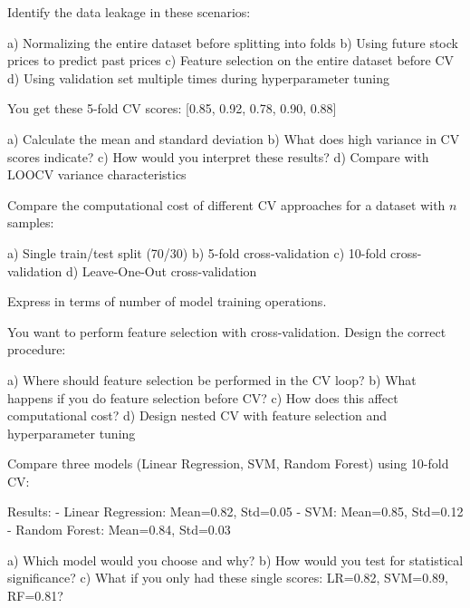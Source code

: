 \documentclass{article}
\newcounter{exercise}
\begin{document}
\begin{tcolorbox}[colback=gray!5!white,colframe=gray!75!black,title=Problem \stepcounter{exercise}: Data Leakage Identification]

Identify the data leakage in these scenarios:

a) Normalizing the entire dataset before splitting into folds
b) Using future stock prices to predict past prices
c) Feature selection on the entire dataset before CV
d) Using validation set multiple times during hyperparameter tuning
\end{tcolorbox}

\begin{tcolorbox}[colback=gray!5!white,colframe=gray!75!black,title=Problem \stepcounter{exercise}: CV Variance Analysis]

You get these 5-fold CV scores: [0.85, 0.92, 0.78, 0.90, 0.88]

a) Calculate the mean and standard deviation
b) What does high variance in CV scores indicate?
c) How would you interpret these results?
d) Compare with LOOCV variance characteristics
\end{tcolorbox}

\begin{tcolorbox}[colback=gray!5!white,colframe=gray!75!black,title=Problem \stepcounter{exercise}: Computational Complexity]

Compare the computational cost of different CV approaches for a dataset with $n$ samples:

a) Single train/test split (70/30)
b) 5-fold cross-validation  
c) 10-fold cross-validation
d) Leave-One-Out cross-validation

Express in terms of number of model training operations.
\end{tcolorbox}

\begin{tcolorbox}[colback=gray!5!white,colframe=gray!75!black,title=Problem \stepcounter{exercise}: Feature Selection with CV]

You want to perform feature selection with cross-validation. Design the correct procedure:

a) Where should feature selection be performed in the CV loop?
b) What happens if you do feature selection before CV?
c) How does this affect computational cost?
d) Design nested CV with feature selection and hyperparameter tuning
\end{tcolorbox}

\begin{tcolorbox}[colback=gray!5!white,colframe=gray!75!black,title=Problem \stepcounter{exercise}: Model Comparison]

Compare three models (Linear Regression, SVM, Random Forest) using 10-fold CV:

Results:
- Linear Regression: Mean=0.82, Std=0.05
- SVM: Mean=0.85, Std=0.12  
- Random Forest: Mean=0.84, Std=0.03

a) Which model would you choose and why?
b) How would you test for statistical significance?
c) What if you only had these single scores: LR=0.82, SVM=0.89, RF=0.81?
\end{tcolorbox}
\end{document}

